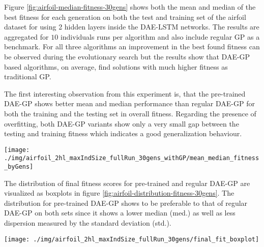 \documentclass[
  11pt,
]{article}
\let\origfigure\figure
\let\endorigfigure\endfigure
\renewenvironment{figure}[1][2] {
    \expandafter\origfigure\expandafter[H]
} {
    \endorigfigure
}
\begin{document}
Figure \ref{fig:airfoil-median-fitness-30gens} shows both the mean and median of the best fitness for each generation on both the test and training set of the airfoil dataset for using 2 hidden layers inside the DAE-LSTM networks. The results are aggregated for \(10\) individuals runs per algorithm and also include regular GP as a benchmark. For all three algorithms an improvement in the best found fitness can be observed during the evolutionary search but the results show that DAE-GP based algorithms, on average, find solutions with much higher fitness as traditional GP.

The first interesting observation from this experiment is, that the pre-trained DAE-GP shows better mean and median performance than regular DAE-GP for both the training and the testing set in overall fitness. Regarding the presence of overfitting, both DAE-GP variants show only a very small gap between the testing and training fitness which indicates a good generalization behaviour.

\begin{figure}[c]

{\centering \texttt{[image: ./img/airfoil\_2hl\_maxIndSize\_fullRun\_30gens\_withGP/mean\_median\_fitness\_byGens]} 

}

\caption{Best Fitness over 30 Generations - Airfoil (2HL)}\label{fig:airfoil-median-fitness-30gens}
\end{figure}

The distribution of final fitness scores for pre-trained and regular DAE-GP are visualized as boxplots in figure \ref{fig:airfoil-distribution-fitness-30gens}. The distribution for pre-trained DAE-GP shows to be preferable to that of regular DAE-GP on both sets since it shows a lower median (med.) as well as less dispersion measured by the standard deviation (std.).

\begin{figure}[c]

{\centering \texttt{[image: ./img/airfoil\_2hl\_maxIndSize\_fullRun\_30gens/final\_fit\_boxplot]} 

}

\caption{Best Fitness after 30 Generations - Airfoil (2HL)}\label{fig:airfoil-distribution-fitness-30gens}
\end{figure}
\end{document}
